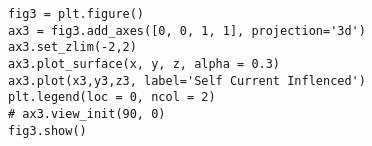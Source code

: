 \documentclass[a4paper,12pt]{article}
\begin{document}
\begin{CJK}{UTF8}{gbsn}
\begin{lstlisting}
fig3 = plt.figure()
ax3 = fig3.add_axes([0, 0, 1, 1], projection='3d')
ax3.set_zlim(-2,2)
ax3.plot_surface(x, y, z, alpha = 0.3)
ax3.plot(x3,y3,z3, label='Self Current Inflenced')
plt.legend(loc = 0, ncol = 2)
# ax3.view_init(90, 0)
fig3.show()
\end{lstlisting}

\end{CJK}
\end{document}
